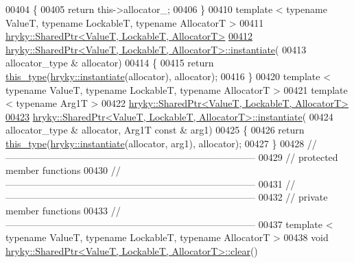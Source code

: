 \begin{DoxyCode}
00404 \textcolor{keyword}{}\{
00405     \textcolor{keywordflow}{return} this->allocator\_;
00406 \}
00410 \textcolor{keyword}{template} < \textcolor{keyword}{typename} ValueT, \textcolor{keyword}{typename} LockableT, \textcolor{keyword}{typename} AllocatorT >
00411 \hyperlink{classhryky_1_1_shared_ptr}{hryky::SharedPtr<ValueT, LockableT, AllocatorT>}
\hypertarget{shared__ptr_8h_source_l00412}{}\hyperlink{classhryky_1_1_shared_ptr_a51f756b899403aa6c8a182bb5bbfd6a8}{00412} \hyperlink{namespacehryky_a7e731db6d90571cf1aea6e113d43b6ad}{hryky::SharedPtr<ValueT, LockableT, AllocatorT>::instantiate}(
00413     allocator\_type & allocator)
00414 \{
00415     \textcolor{keywordflow}{return} \hyperlink{classhryky_1_1_shared_ptr}{this_type}(\hyperlink{namespacehryky_a7e731db6d90571cf1aea6e113d43b6ad}{hryky::instantiate}(allocator), allocator);
00416 \}
00420 \textcolor{keyword}{template} < \textcolor{keyword}{typename} ValueT, \textcolor{keyword}{typename} LockableT, \textcolor{keyword}{typename} AllocatorT >
00421 \textcolor{keyword}{template} < \textcolor{keyword}{typename} Arg1T >
00422 \hyperlink{classhryky_1_1_shared_ptr}{hryky::SharedPtr<ValueT, LockableT, AllocatorT>}
\hypertarget{shared__ptr_8h_source_l00423}{}\hyperlink{classhryky_1_1_shared_ptr_a74208f1d0f90c51593b6d811934d65de}{00423} \hyperlink{namespacehryky_a7e731db6d90571cf1aea6e113d43b6ad}{hryky::SharedPtr<ValueT, LockableT, AllocatorT>::instantiate}(
00424     allocator\_type & allocator, Arg1T \textcolor{keyword}{const} & arg1)
00425 \{
00426     \textcolor{keywordflow}{return} \hyperlink{classhryky_1_1_shared_ptr}{this_type}(\hyperlink{namespacehryky_a7e731db6d90571cf1aea6e113d43b6ad}{hryky::instantiate}(allocator, arg1), allocator);
00427 \}
00428 \textcolor{comment}{//
      ------------------------------------------------------------------------------}
00429 \textcolor{comment}{// protected member functions}
00430 \textcolor{comment}{//
      ------------------------------------------------------------------------------}
00431 \textcolor{comment}{//
      ------------------------------------------------------------------------------}
00432 \textcolor{comment}{// private member functions}
00433 \textcolor{comment}{//
      ------------------------------------------------------------------------------}
00437 \textcolor{comment}{}\textcolor{keyword}{template} < \textcolor{keyword}{typename} ValueT, \textcolor{keyword}{typename} LockableT, \textcolor{keyword}{typename} AllocatorT >
00438 \textcolor{keywordtype}{void} \hyperlink{namespacehryky_aa201297ea9530da954a7230be71cc19d}{hryky::SharedPtr<ValueT, LockableT, AllocatorT>::clear}()

\end{DoxyCode}

